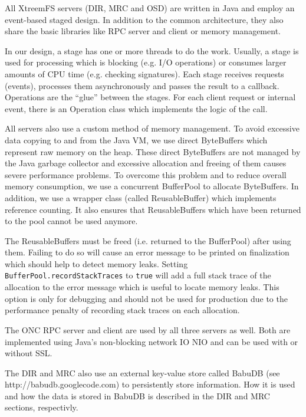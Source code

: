 All XtreemFS servers (DIR, MRC and OSD) are written in Java and employ an event-based staged design. In addition to the common architecture, they also share the basic libraries like RPC server and client or memory management.

In our design, a stage has one or more threads to do the work. Usually, a stage is used for processing which is blocking (e.g. I/O operations) or consumes larger amounts of CPU time (e.g. checking signatures). Each stage receives requests (events), processes them asynchronously and passes the result to a callback. Operations are the ``glue'' between the stages. For each client request or internal event, there is an Operation class which implements the logic of the call.

All servers also use a custom method of memory management. To avoid excessive data copying to and from the Java VM, we use direct ByteBuffers which represent raw memory on the heap. These direct ByteBuffers are not managed by the Java garbage collector and excessive allocation and freeing of them causes severe performance problems. To overcome this problem and to reduce overall memory consumption, we use a concurrent BufferPool to allocate ByteBuffers. In addition, we use a wrapper class (called ReusableBuffer) which implements reference counting. It also ensures that ReusableBuffers which have been returned to the pool cannot be used anymore.

The ReusableBuffers must be freed (i.e. returned to the BufferPool) after using them. Failing to do so will cause an error message to be printed on finalization which should help to detect memory leaks. Setting \texttt{Buffer\-Pool.record\-Stack\-Traces} to \texttt{true} will add a full stack trace of the allocation to the error message which is useful to locate memory leaks. This option is only for debugging and should not be used for production due to the performance penalty of recording stack traces on each allocation.

The ONC RPC server and client are used by all three servers as well. Both are implemented using Java's non-blocking network IO NIO and can be used with or without SSL.

The DIR and MRC also use an external key-value store called BabuDB (see http://babudb.googlecode.com) to persistently store information. How it is used and how the data is stored in BabuDB is described in the DIR and MRC sections, respectivly.